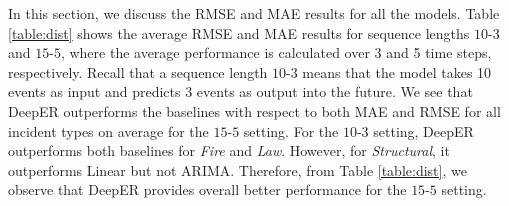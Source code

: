 In this section, we discuss the RMSE and MAE results for all the models. Table \ref{table:dist} shows the average RMSE and MAE results for sequence lengths $10$-$3$ and $15$-$5$, where the average performance is calculated over 3 and 5 time steps, respectively. Recall that a sequence length  $10$-$3$ means that the model takes 10 events as input and predicts 3 events as output into the future. We see that DeepER outperforms the baselines with respect to  both MAE and RMSE for all incident types on average for the $15$-$5$ setting. For the  $10$-$3$ setting,  DeepER outperforms both baselines for \textit{Fire} and \textit{Law}. However, for \textit{Structural}, it outperforms Linear but not ARIMA. Therefore, from Table \ref{table:dist}, we observe that  DeepER   provides overall better performance for the $15$-$5$  setting.

\begin{table}[!ht]
\centering
{}
\caption{Average RMSE}
\label{table:dist}
\vspace{-7mm}
\end{table}




